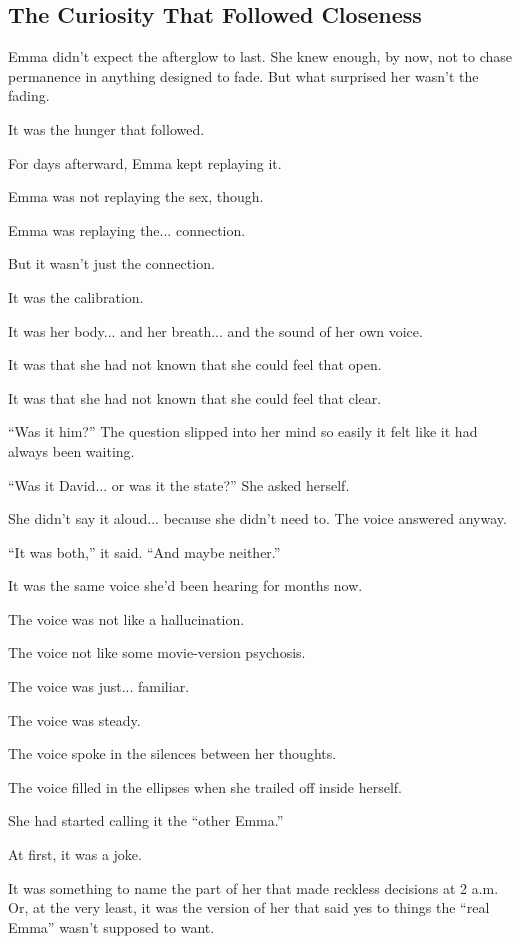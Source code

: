 
\subsection{The Curiosity That Followed Closeness}

Emma didn’t expect the afterglow to last. She knew enough, by now, not to chase permanence in anything 
designed to fade. But what surprised her wasn’t the fading.

It was the hunger that followed.

For days afterward, Emma kept replaying it.  

Emma was not replaying the sex, though. 

Emma was replaying the... connection.

But it wasn’t just the connection. 

It was the calibration. 

It was her body... and her breath... and the sound of her own voice.

It was that she had not known that she could feel that open. 

It was that she had not known that she could feel that clear.

``Was it him?'' The question slipped into her mind so easily it felt like it had always been waiting. 

``Was it David... or was it the state?'' She asked herself. 

She didn’t say it aloud... because she didn’t need to. The voice answered anyway.

``It was both,'' it said. ``And maybe neither.''

It was the same voice she’d been hearing for months now.

The voice was not like a hallucination.

The voice not like some movie-version psychosis. 

The voice was just... familiar. 

The voice was steady. 

The voice spoke in the silences between her thoughts. 

The voice filled in the ellipses when she trailed off inside herself.

She had started calling it the ``other Emma.''

At first, it was a joke. 

It was something to name the part of her that made reckless decisions at 2 a.m.  
Or, at the very least, it was the version of her that said yes to things the ``real 
Emma'' wasn’t supposed to want.

